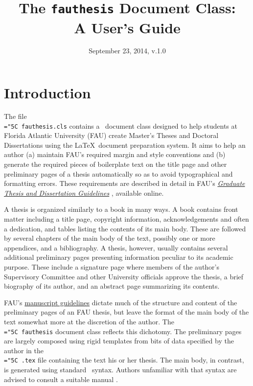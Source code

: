 \documentclass[11pt]{article}
\title{The \texttt{fauthesis} Document Class:\\ A User's Guide}
\author{Christopher Beetle%
	\footnote{\href{mailto:cbeetle@physics.fau.edu}{\nolinkurl{cbeetle@physics.fau.edu}}\hfill
		Document Class URL: \url\home}}
\date{September 23, 2014, v.1.0}
\newcommand\guide{{http://www.fau.edu/graduate/forms-and-procedures/degree-completion/thesis-and-dissertation/index.php}}
\newcommand\code[1]{{\normalfont\texttt{\let\dv\textsl\chardef\\="5C #1}}}
\begin{document}
\maketitle



\section{Introduction}

The file \code{fauthesis.cls} contains a \LaTeXe\ document class designed to help students at Florida Atlantic University (FAU) create Master's Theses and Doctoral Dissertations using the \LaTeX\ document preparation system.  It aims to help an author (a) maintain FAU's required margin and style conventions and (b) generate the required pieces of boilerplate text on the title page and other preliminary pages of a thesis automatically so as to avoid typographical and formatting errors.  These requirements are described in detail in FAU's 
\href\guide{\textit{Graduate Thesis and Dissertation Guidelines}} 
\cite{GC:guide}, available online.

A thesis is organized similarly to a book in many ways.  A book contains front matter including a title page, copyright information, acknowledgements and often a dedication, and tables listing the contents of its main body.  These are followed by several chapters of the main body of the text, possibly one or more appendices, and a bibliography.  A thesis, however, usually contains several additional preliminary pages presenting information peculiar to its academic purpose.  These include a signature page where members of the author's Supervisory Committee and other University officials approve the thesis, a brief biography of its author, and an abstract page summarizing its contents.

FAU's 
\href\guide{manuscript guidelines} 
dictate much of the structure and content of the preliminary pages of an FAU thesis, but leave the format of the main body of the text somewhat more at the discretion of the author.  The \code{fauthesis} document class reflects this dichotomy.  The preliminary pages are largely composed using rigid templates from bits of data specified by the author in the \code{.tex} file containing the text his or her thesis.  The main body, in contrast, is generated using standard \LaTeXe\ syntax.  Authors unfamiliar with that syntax are advised to consult a suitable manual \cite{L:latex, KD:guide, L3:latex2e, OPHS:intro, WB:latex}.
\end{document}
